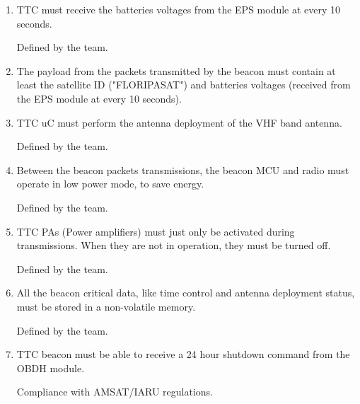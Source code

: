 \documentclass[12pt]{book}
\begin{document}
\begin{enumerate}[label=\textit{TMR \arabic*}, leftmargin=*, align=left]
	\item TTC must receive the batteries voltages from the EPS module at every 10 seconds.
	
	\begin{footnotesize}
		Defined by the team.
	\end{footnotesize}
	
	\item The payload from the packets transmitted by the beacon must contain at least the satellite ID ("FLORIPASAT") and batteries voltages (received from the EPS module at every 10 seconds).
	\item TTC uC must perform the antenna deployment of the VHF band antenna.
	
	\begin{footnotesize}
		Defined by the team.
	\end{footnotesize}
	
	\item Between the beacon packets transmissions, the beacon MCU and radio must operate in low power mode, to save energy.
	
	\begin{footnotesize}
		Defined by the team.
	\end{footnotesize}
	
	\item TTC PAs (Power amplifiers) must just only be activated during transmissions. When they are not in operation, they must be turned off.
	
	\begin{footnotesize}
		Defined by the team.
	\end{footnotesize}
	
	\item All the beacon critical data, like time control and antenna deployment status, must be stored in a non-volatile memory.
	
	\begin{footnotesize}
		Defined by the team.
	\end{footnotesize}
	
	\item TTC beacon must be able to receive a 24 hour shutdown command from the OBDH module.
	
	\begin{footnotesize}
		Compliance with AMSAT/IARU regulations.
	\end{footnotesize}
	
\end{enumerate}
\end{document}
